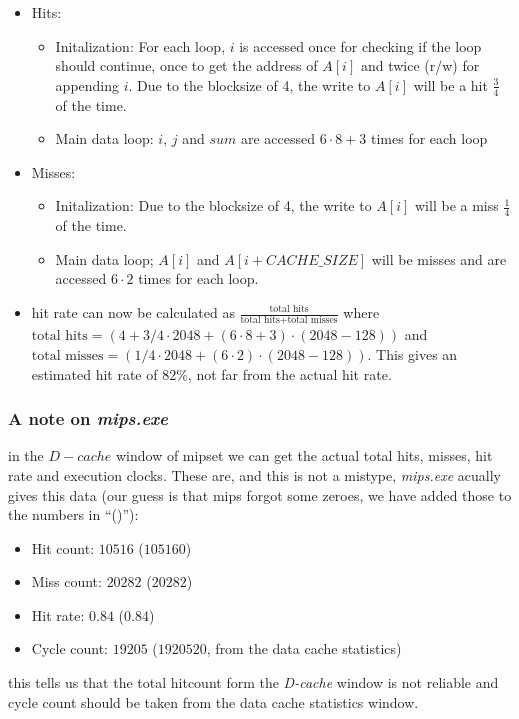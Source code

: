 \begin{itemize}
  \item Hits:
  \begin{itemize}
    \item Initalization: For each loop, $i$ is accessed once for checking if the
    loop should continue, once to get the address of $A[i]$ and twice (r/w) for
    appending $i$.
    Due to the blocksize of 4, the write to $A[i]$ will be a hit
    $\frac{3}{4}$ of the time.
    \item Main data loop: $i$, $j$ and $sum$ are accessed $6\cdot 8 + 3$ times
    for each loop
  \end{itemize}
  \item Misses:
  \begin{itemize}
    \item Initalization: Due to the blocksize of 4, the write to $A[i]$ will be
    a miss $\frac{1}{4}$ of the time.
    \item Main data loop; $A[i]$ and $A[i + CACHE\_SIZE]$ will be misses and are
    accessed $6\cdot 2$ times for each loop.
  \end{itemize}
  \item hit rate can now be calculated as $\frac{\mbox{total
  hits}}{\mbox{total hits}+\mbox{total misses}}$ where $\mbox{total hits} =
  (4+3/4\cdot2048 + (6\cdot8+3)\cdot(2048-128))$ and $\mbox{total misses} =
  (1/4\cdot2048 + (6\cdot2)\cdot(2048-128))$. This gives an estimated hit rate
  of $82\%$, not far from the actual hit rate.
\end{itemize}
\subsubsection{A note on \emph{mips.exe}} in the $D-cache$ window of mipset we
can get the actual total hits, misses, hit rate and execution clocks. These are, and
this is not a mistype, \emph{mips.exe} acually gives this data (our guess is
that mips forgot some zeroes, we have added those to the numbers in ``()''):
\begin{itemize}
  \item Hit count: $10516$ ($105160$)
  \item Miss count: $20282$ ($20282$)
  \item Hit rate: $0.84$ ($0.84$)
  \item Cycle count: $19205$ ($1920520$, from the data cache statistics)
\end{itemize}
this tells us that the total hitcount form the \emph{D-cache} window is not
reliable and cycle count should be taken from the data cache statistics window.

